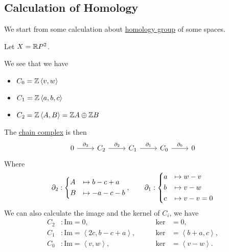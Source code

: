 \subsection{Calculation of Homology}
We start from some calculation about \hyperref[def:homology-group]{homology group} of some spaces.
\begin{eg}
	Let \(X = \mathbb{\MakeUppercase{r}} P^{2} \).
	\begin{figure}[H]
		\centering
		\label{fig:eg:homology-RP2}
	\end{figure}
	We see that we have
	\begin{itemize}
		\item \(C_0 = \mathbb{\MakeUppercase{z}} \left< v, w \right> \)
		\item \(C_1 = \mathbb{\MakeUppercase{z}} \left< a, b, c \right> \)
		\item \(C_2 = \mathbb{\MakeUppercase{z}} \left< A, B \right> = \mathbb{\MakeUppercase{z}} A \oplus \mathbb{\MakeUppercase{z}} B\)
	\end{itemize}
	The \hyperref[def:chain-complex]{chain complex} is then
	\[
		\begin{tikzcd}
			0 & {C_2} & {C_1} & {C_0} & 0
			\arrow["{\partial_3}", from=1-1, to=1-2]
			\arrow["{\partial_2}", from=1-2, to=1-3]
			\arrow["{\partial_1}", from=1-3, to=1-4]
			\arrow["{\partial_0}", from=1-4, to=1-5]
		\end{tikzcd}
	\]
	Where
	\[
		\partial_2: \begin{dcases}
			A & \mapsto b - c + a \\
			B & \mapsto -a-c-b    \\
		\end{dcases},\qquad \partial_1: \begin{dcases}
			a & \mapsto w - v     \\
			b & \mapsto v - w     \\
			c & \mapsto v - v = 0 \\
		\end{dcases}
	\]
	We can also calculate the image and the kernel of \(C_{i} \), we have
	\[
		\begin{alignedat}{3}
			C_2&: \mathrm{Im} = 0, &\mathrm{ker} &= 0, \\
			C_1&: \mathrm{Im} = \left< 2c, b - c + a \right> , \qquad&\mathrm{ker} &= \left< b +a, c \right>,\\
			C_0&: \mathrm{Im} = \left< v, w\right> , &\mathrm{ker} &= \left< v - w\right>.
		\end{alignedat}
\]
\end{eg}
